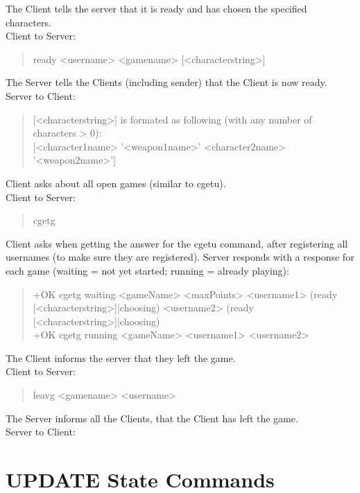 \documentclass[a4paper,11pt]{article}
\begin{document}
\noindent
The Client tells the server that it is ready and has chosen the specified characters.\\
Client to Server:
\begin{quote}
  ready <username> <gamename> [<characterstring>]
\end{quote}

\noindent
The Server tells the Clients (including sender) that the Client is now ready.
Server to Client:
\begin{quote}
  $[$<characterstring>$]$  is formated as following (with any number of characters > 0):\\
	$[$<character1name> '<weapon1name>' <character2name> '<weapon2name>'$]$ 
\end{quote}	

\noindent
Client asks about all open games (similar to cgetu).\\
Client to Server:
\begin{quote}
  cgetg
\end{quote}

\noindent	
Client asks when getting the answer for the cgetu command, after registering all usernames (to make sure they are registered).
Server responds with a response for each game (waiting = not yet started; running = already playing):
\begin{quote}
  +OK cgetg waiting <gameName> <maxPoints> <username1> (ready [<characterstring>]|choosing) <username2> (ready [<characterstring>]|choosing)\\
  +OK cgetg running <gameName> <username1> <username2>
\end{quote}

\noindent
The Client informs the server that they left the game.\\
Client to Server:
\begin{quote}
  leavg <gamename> <username>
\end{quote}

\noindent
The Server informs all the Clients, that the Client has left the game.\\
Server to Client:

\clearpage
\section{UPDATE State Commands}
\end{document}
